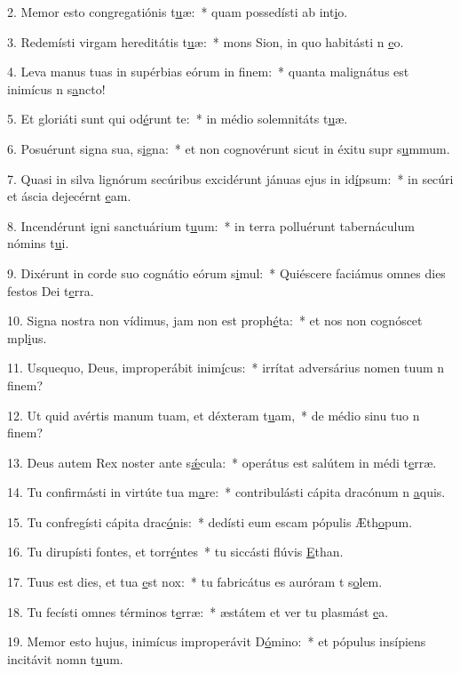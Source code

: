 2. Memor esto congregatiónis t\uline{u}æ:~* quam possedísti ab int\uline{i}o.\par 
3. Redemísti virgam hereditátis t\uline{u}æ:~* mons Sion, in quo habitásti n \uline{e}o.\par 
4. Leva manus tuas in supérbias eórum in f\uline{i}nem:~* quanta malignátus est inimícus n s\uline{a}ncto!\par 
5. Et gloriáti sunt qui od\uline{é}runt te:~* in médio solemnitáts t\uline{u}æ.\par 
6. Posuérunt signa sua, s\uline{i}gna:~* et non cognovérunt sicut in éxitu supr s\uline{u}mmum.\par 
7. Quasi in silva lignórum secúribus excidérunt jánuas ejus in id\uline{í}psum:~* in secúri et áscia dejecérnt \uline{e}am.\par 
8. Incendérunt igni sanctuárium t\uline{u}um:~* in terra polluérunt tabernáculum nómins t\uline{u}i.\par 
9. Dixérunt in corde suo cognátio eórum s\uline{i}mul:~* Quiéscere faciámus omnes dies festos Dei  t\uline{e}rra.\par 
10. Signa nostra non vídimus, jam non est proph\uline{é}ta:~* et nos non cognóscet mpl\uline{i}us.\par 
11. Usquequo, Deus, improperábit inim\uline{í}cus:~* irrítat adversárius nomen tuum n f\uline{i}nem?\par 
12. Ut quid avértis manum tuam, et déxteram t\uline{u}am,~* de médio sinu tuo n f\uline{i}nem?\par 
13. Deus autem Rex noster ante s\uline{ǽ}cula:~* operátus est salútem in médi t\uline{e}rræ.\par 
14. Tu confirmásti in virtúte tua m\uline{a}re:~* contribulásti cápita dracónum n \uline{a}quis.\par 
15. Tu confregísti cápita drac\uline{ó}nis:~* dedísti eum escam pópulis Æth\uline{o}pum.\par 
16. Tu dirupísti fontes, et torr\uline{é}ntes~* tu siccásti flúvis \uline{E}than.\par 
17. Tuus est dies, et tua \uline{e}st nox:~* tu fabricátus es auróram t s\uline{o}lem.\par 
18. Tu fecísti omnes términos t\uline{e}rræ:~* æstátem et ver tu plasmást \uline{e}a.\par 
19. Memor esto hujus, inimícus improperávit D\uline{ó}mino:~* et pópulus insípiens incitávit nomn t\uline{u}um.\par 
